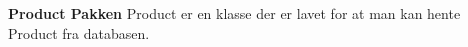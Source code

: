 \textbf{Product Pakken}\newline
Product er en klasse der er lavet for at man kan hente Product fra databasen.  

